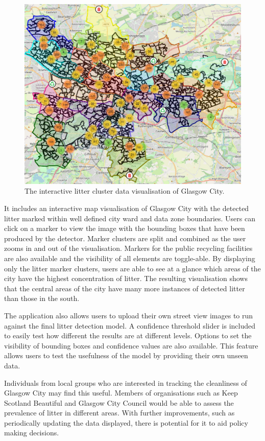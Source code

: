 \documentclass{thesis}
\begin{document}
\begin{figure}[h]
    \centering
    \includegraphics[scale=0.40]{images/glasgow-city.PNG}
    \caption{The interactive litter cluster data visualisation of Glasgow City.}
\end{figure}

It includes an interactive map visualisation of Glasgow City with the detected litter marked within well defined city ward and data zone boundaries. Users can click on a marker to view the image with the bounding boxes that have been produced by the detector. Marker clusters are split and combined as the user zooms in and out of the visualisation. Markers for the public recycling facilities are also available and the visibility of all elements are toggle-able. By displaying only the litter marker clusters, users are able to see at a glance which areas of the city have the highest concentration of litter. The resulting visualisation shows that the central areas of the city have many more instances of detected litter than those in the south.

The application also allows users to upload their own street view images to run against the final litter detection model. A confidence threshold slider is included to easily test how different the results are at different levels. Options to set the visibility of bounding boxes and confidence values are also available. This feature allows users to test the usefulness of the model by providing their own unseen data.

Individuals from local groups who are interested in tracking the cleanliness of Glasgow City may find this useful. Members of organisations such as Keep Scotland Beautiful and Glasgow City Council would be able to assess the prevalence of litter in different areas. With further improvements, such as periodically updating the data displayed, there is potential for it to aid policy making decisions.
\end{document}
